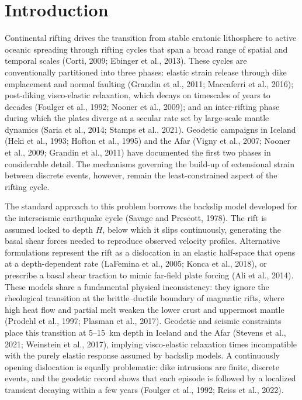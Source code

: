 \documentclass[12pt]{article}
\begin{document}
\section{Introduction}
\label{sec:intro}

Continental rifting drives the transition from stable cratonic lithosphere
to active oceanic spreading through rifting cycles that span a broad range
of spatial and temporal scales (Corti, 2009; Ebinger et al., 2013). These
cycles are conventionally partitioned into three phases: elastic strain
release through dike emplacement and normal faulting (Grandin et al., 2011;
Maccaferri et al., 2016); post-diking visco-elastic relaxation, which
decays on timescales of years to decades (Foulger et al., 1992; Nooner et
al., 2009); and an inter-rifting phase during which the plates diverge at
a secular rate set by large-scale mantle dynamics (Saria et al., 2014;
Stamps et al., 2021). Geodetic campaigns in Iceland (Heki et al., 1993;
Hofton et al., 1995) and the Afar (Vigny et al., 2007; Nooner et al., 2009; Grandin et al.,
2011) have documented the first two phases in considerable detail. The
mechanisms governing the build-up of extensional strain between discrete
events, however, remain the least-constrained aspect of the rifting cycle.

The standard approach to this problem borrows the backslip model developed
for the interseismic earthquake cycle (Savage and Prescott, 1978). The rift
is assumed locked to depth $H$, below which it slips continuously,
generating the basal shear forces needed to reproduce observed velocity
profiles. Alternative formulations represent the rift as a
dislocation in an elastic half-space that opens at a depth-dependent rate
(LaFemina et al., 2005; Konca et al., 2018), or prescribe a basal shear
traction to mimic far-field plate forcing (Ali et al., 2014). These models
share a fundamental physical inconsistency: they ignore the rheological
transition at the brittle--ductile boundary of magmatic rifts, where high
heat flow and partial melt weaken the lower crust and uppermost mantle
(Prodehl et al., 1997; Plasman et al., 2017). Geodetic and seismic
constraints place this transition at 5--15~km depth in Iceland and the
Afar (Stevens et al., 2021; Weinstein et al., 2017), implying visco-elastic
relaxation times incompatible with the purely elastic response assumed by
backslip models. A continuously opening dislocation is equally problematic:
dike intrusions are finite, discrete events, and the geodetic record shows
that each episode is followed by a localized transient decaying within a
few years (Foulger et al., 1992; Reiss et al., 2022).
\end{document}
